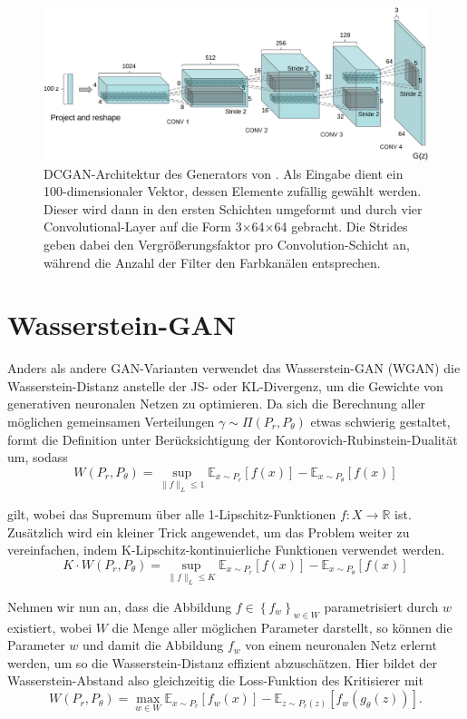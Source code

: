 \begin{figure}
\includegraphics[width=\textwidth]{images/dcgan-architecture}
\caption{DCGAN-Architektur des Generators von
\cite{radford2016unsupervised}. Als Eingabe dient ein 100-dimensionaler
Vektor, dessen Elemente zufällig gewählt werden. Dieser wird dann in den
ersten Schichten umgeformt und durch vier Convolutional-Layer auf die Form
3$\times$64$\times$64 gebracht. Die Strides geben dabei den
Vergrößerungsfaktor pro Convolution-Schicht an, während die Anzahl der
Filter den Farbkanälen entsprechen.}
\end{figure}

\section{Wasserstein-GAN}
Anders als andere GAN-Varianten verwendet das Wasserstein-GAN (WGAN) die
Was\-ser\-stein-Distanz anstelle der JS- oder KL-Divergenz, um die Gewichte
von generativen neuronalen Netzen zu optimieren. Da sich die Berechnung aller
möglichen gemeinsamen Verteilungen $\gamma \sim \Pi(P_r, P_\theta)$ etwas schwierig
gestaltet, formt \cite{arjovsky2017wasserstein} die Definition unter
Berücksichtigung der Kontorovich-Rubinstein-Dualität um, sodass
\[
W(P_r, P_\theta) = \sup_{\|f\|_L \leq 1} \mathbb{E}_{x \sim P_r}\left[f(x)\right] - \mathbb{E}_{x \sim P_\theta}\left[f(x)\right]
\]

gilt, wobei das Supremum über alle 1-Lipschitz-Funktionen $f : X \to
\mathbb{R}$ ist. Zusätzlich wird ein kleiner Trick angewendet, um das Problem
weiter zu vereinfachen, indem K-Lipschitz-kontinuierliche Funktionen verwendet
werden.
\[
K \cdot W(P_r, P_\theta) = \sup_{\|f\|_L \leq K} \mathbb{E}_{x \sim P_r}\left[f(x)\right] - \mathbb{E}_{x \sim P_\theta}\left[f(x)\right]
\]

Nehmen wir nun an, dass die Abbildung $f \in \left\{f_w\right\}_{w \in W}$
parametrisiert durch $w$ existiert, wobei $W$ die Menge aller möglichen
Parameter darstellt, so können die Parameter $w$ und damit die Abbildung $f_w$
von einem neuronalen Netz erlernt werden, um so die Wasserstein-Distanz
effizient abzuschätzen. Hier bildet der Wasserstein-Abstand also gleichzeitig
die Loss-Funktion des Kritisierer mit
\[
W(P_r, P_\theta) = \max_{w \in W} \mathbb{E}_{x \sim P_r}\left[f_w(x)\right]
- \mathbb{E}_{z \sim P_r(z)}\left[f_w(g_\theta(z))\right].
\]

